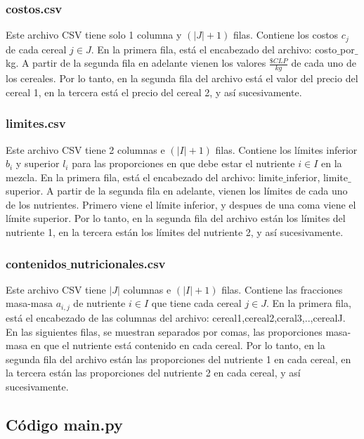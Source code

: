 \documentclass[addpoints,10pt]{exam}
\begin{document}
\begin{questions}
\subsubsection{costos.csv}
Este archivo CSV tiene solo 1 columna y $(|J|+1)$ filas. Contiene los costos $c_j$ de cada cereal $j \in J$. En la primera fila, está el encabezado del archivo: costo$\_$por$\_$kg. A partir de la segunda fila en adelante vienen los valores $\frac{\$CLP}{kg}$ de cada uno de los cereales. Por lo tanto, en la segunda fila del archivo está el valor del precio del cereal 1, en la tercera está el precio del cereal 2, y así sucesivamente.

\subsubsection{limites.csv}
Este archivo CSV tiene 2 columnas  e $(|I| +1)$ filas. Contiene los límites inferior $b_i$ y superior $l_i$ para las proporciones en que debe estar el nutriente $i \in I$ en la mezcla. En la primera fila, está el encabezado del archivo: limite$\_$inferior, limite$\_$superior. A partir de la segunda fila en adelante, vienen los límites de cada uno de los nutrientes. Primero viene el límite inferior, y despues de una coma viene el límite superior. Por lo tanto, en la segunda fila del archivo están los límites del nutriente 1, en la tercera están los límites del nutriente 2, y así sucesivamente.

\subsubsection{contenidos$\_$nutricionales.csv}
Este archivo CSV tiene $|J|$ columnas e $(|I| +1)$ filas. Contiene las fracciones masa-masa $a_{i,j}$ de nutriente $i \in I$ que tiene cada cereal $j \in J$. En la primera fila, está el encabezado de las columnas del archivo: cereal1,cereal2,ceral3,..,cerealJ. En las siguientes filas, se muestran separados por comas, las proporciones masa-masa en que el nutriente está contenido en cada cereal. Por lo tanto, en la segunda fila del archivo están las proporciones del nutriente 1 en cada cereal, en la tercera están las proporciones del nutriente 2 en cada cereal, y así sucesivamente.

\subsection{Código main.py}


\end{questions}
\end{document}
